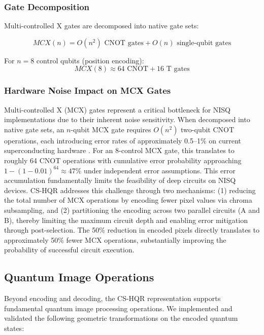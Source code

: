 \documentclass[11pt,a4paper]{article}
\begin{document}
\subsubsection{Gate Decomposition}

Multi-controlled X gates are decomposed into native gate sets:

\begin{equation}
MCX(n) = O(n^2) \text{ CNOT gates} + O(n) \text{ single-qubit gates}
\label{eq:mcx_decomposition}
\end{equation}

For $n = 8$ control qubits (position encoding):
\begin{equation}
MCX(8) \approx 64 \text{ CNOT} + 16 \text{ T gates}
\label{eq:mcx8}
\end{equation}

\subsubsection{Hardware Noise Impact on MCX Gates}

Multi-controlled X (MCX) gates represent a critical bottleneck for NISQ implementations due to their inherent noise sensitivity. When decomposed into native gate sets, an $n$-qubit MCX gate requires $O(n^2)$ two-qubit CNOT operations, each introducing error rates of approximately 0.5--1\% on current superconducting hardware \cite{ref9}. For an 8-control MCX gate, this translates to roughly 64 CNOT operations with cumulative error probability approaching $1 - (1 - 0.01)^{64} \approx 47\%$ under independent error assumptions. This error accumulation fundamentally limits the feasibility of deep circuits on NISQ devices. CS-HQR addresses this challenge through two mechanisms: (1) reducing the total number of MCX operations by encoding fewer pixel values via chroma subsampling, and (2) partitioning the encoding across two parallel circuits (A and B), thereby limiting the maximum circuit depth and enabling error mitigation through post-selection. The 50\% reduction in encoded pixels directly translates to approximately 50\% fewer MCX operations, substantially improving the probability of successful circuit execution.

\subsection{Quantum Image Operations}

Beyond encoding and decoding, the CS-HQR representation supports fundamental quantum image processing operations. We implemented and validated the following geometric transformations on the encoded quantum states:
\end{document}
